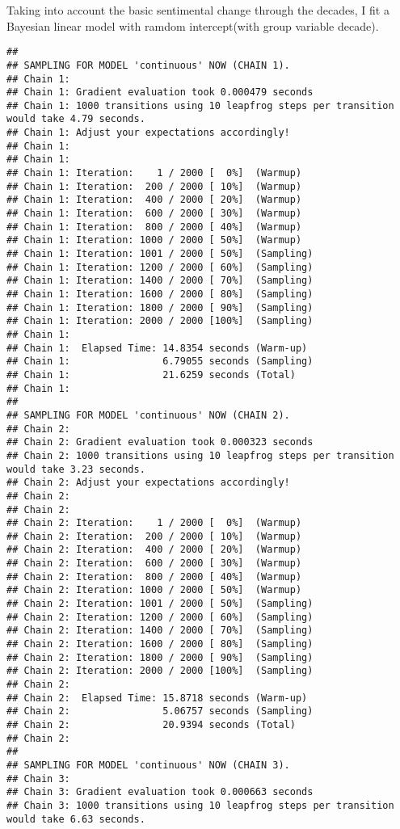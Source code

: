 \documentclass[]{article}
\begin{document}
Taking into account the basic sentimental change through the decades, I
fit a Bayesian linear model with ramdom intercept(with group variable
decade).

\begin{verbatim}
## 
## SAMPLING FOR MODEL 'continuous' NOW (CHAIN 1).
## Chain 1: 
## Chain 1: Gradient evaluation took 0.000479 seconds
## Chain 1: 1000 transitions using 10 leapfrog steps per transition would take 4.79 seconds.
## Chain 1: Adjust your expectations accordingly!
## Chain 1: 
## Chain 1: 
## Chain 1: Iteration:    1 / 2000 [  0%]  (Warmup)
## Chain 1: Iteration:  200 / 2000 [ 10%]  (Warmup)
## Chain 1: Iteration:  400 / 2000 [ 20%]  (Warmup)
## Chain 1: Iteration:  600 / 2000 [ 30%]  (Warmup)
## Chain 1: Iteration:  800 / 2000 [ 40%]  (Warmup)
## Chain 1: Iteration: 1000 / 2000 [ 50%]  (Warmup)
## Chain 1: Iteration: 1001 / 2000 [ 50%]  (Sampling)
## Chain 1: Iteration: 1200 / 2000 [ 60%]  (Sampling)
## Chain 1: Iteration: 1400 / 2000 [ 70%]  (Sampling)
## Chain 1: Iteration: 1600 / 2000 [ 80%]  (Sampling)
## Chain 1: Iteration: 1800 / 2000 [ 90%]  (Sampling)
## Chain 1: Iteration: 2000 / 2000 [100%]  (Sampling)
## Chain 1: 
## Chain 1:  Elapsed Time: 14.8354 seconds (Warm-up)
## Chain 1:                6.79055 seconds (Sampling)
## Chain 1:                21.6259 seconds (Total)
## Chain 1: 
## 
## SAMPLING FOR MODEL 'continuous' NOW (CHAIN 2).
## Chain 2: 
## Chain 2: Gradient evaluation took 0.000323 seconds
## Chain 2: 1000 transitions using 10 leapfrog steps per transition would take 3.23 seconds.
## Chain 2: Adjust your expectations accordingly!
## Chain 2: 
## Chain 2: 
## Chain 2: Iteration:    1 / 2000 [  0%]  (Warmup)
## Chain 2: Iteration:  200 / 2000 [ 10%]  (Warmup)
## Chain 2: Iteration:  400 / 2000 [ 20%]  (Warmup)
## Chain 2: Iteration:  600 / 2000 [ 30%]  (Warmup)
## Chain 2: Iteration:  800 / 2000 [ 40%]  (Warmup)
## Chain 2: Iteration: 1000 / 2000 [ 50%]  (Warmup)
## Chain 2: Iteration: 1001 / 2000 [ 50%]  (Sampling)
## Chain 2: Iteration: 1200 / 2000 [ 60%]  (Sampling)
## Chain 2: Iteration: 1400 / 2000 [ 70%]  (Sampling)
## Chain 2: Iteration: 1600 / 2000 [ 80%]  (Sampling)
## Chain 2: Iteration: 1800 / 2000 [ 90%]  (Sampling)
## Chain 2: Iteration: 2000 / 2000 [100%]  (Sampling)
## Chain 2: 
## Chain 2:  Elapsed Time: 15.8718 seconds (Warm-up)
## Chain 2:                5.06757 seconds (Sampling)
## Chain 2:                20.9394 seconds (Total)
## Chain 2: 
## 
## SAMPLING FOR MODEL 'continuous' NOW (CHAIN 3).
## Chain 3: 
## Chain 3: Gradient evaluation took 0.000663 seconds
## Chain 3: 1000 transitions using 10 leapfrog steps per transition would take 6.63 seconds.

\end{verbatim}
\end{document}
